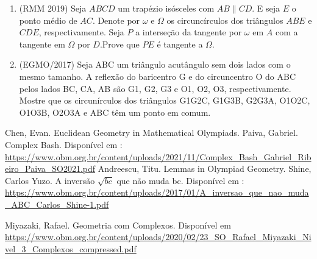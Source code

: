 \documentclass{article}
\begin{document}
\begin{enumerate}
\item 
(RMM 2019)
Seja $ABCD$ um trapézio isósceles com $AB\parallel CD$. E seja $E$ o ponto médio de $AC$. Denote por $\omega$ e $\Omega$ os circuncírculos dos triângulos $ABE$ e $CDE$, respectivamente. Seja $P$ a interseção da tangente por $\omega$ em $A$ com a tangente em $\Omega$ por $D$.Prove que $PE$ é tangente a $\Omega$.
\item 
(EGMO/2017)
 Seja ABC um triângulo acutângulo sem dois lados com o mesmo tamanho. A reflexão do
baricentro G e do circuncentro O do ABC pelos lados BC, CA, AB são G1, G2, G3 e O1, O2, O3, respectivamente. Mostre que os circunírculos dos triângulos G1G2C, G1G3B, G2G3A, O1O2C, O1O3B, O2O3A e
ABC têm um ponto em comum.
\end{enumerate}







\begin{thebibliography}{9}
Chen, Evan. Euclidean Geometry in Mathematical Olympiads.
Paiva, Gabriel. Complex Bash. Disponível em : \href{https://www.obm.org.br/content/uploads/2021/11/Complex_Bash_Gabriel_Ribeiro_Paiva_SO2021.pdf}{https://www.obm.org.br/content/uploads/2021/11/Complex_Bash_Gabriel_Ribeiro_Paiva_SO2021.pdf}
Andreescu, Titu. Lemmas in Olympiad Geometry. 
Shine, Carlos Yuzo. A inversão $\sqrt{bc}$ que não muda bc. Disponível em :
\href{https://www.obm.org.br/content/uploads/2017/01/A_inversao_que_nao_muda_ABC_Carlos_Shine-1.pdf}{https://www.obm.org.br/content/uploads/2017/01/A_inversao_que_nao_muda_ABC_Carlos_Shine-1.pdf}

Miyazaki, Rafael. Geometria com Complexos. Disponível em
\href{https://www.obm.org.br/content/uploads/2020/02/23_SO_Rafael_Miyazaki_Nivel_3_Complexos_compressed.pdf}{https://www.obm.org.br/content/uploads/2020/02/23_SO_Rafael_Miyazaki_Nivel_3_Complexos_compressed.pdf}
\end{thebibliography}
\end{document}
